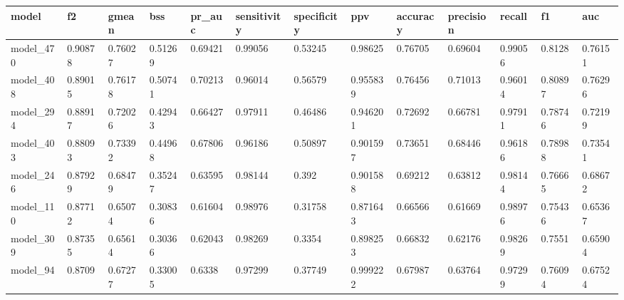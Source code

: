 \begin{tabular}{|l|l|l|l|l|l|l|l|l|l|l|l|l|}
\hline
\textbf{model} & \textbf{f2} & \textbf{gmean} & \textbf{bss} & \textbf{pr\_auc} & \textbf{sensitivity} & \textbf{specificity} & \textbf{ppv} & \textbf{accuracy} & \textbf{precision} & \textbf{recall} & \textbf{f1} & \textbf{auc} \\ \hline
model\_470     & 0.90878     & 0.76027        & 0.51269      & 0.69421          & 0.99056              & 0.53245              & 0.98625      & 0.76705           & 0.69604            & 0.99056         & 0.8128      & 0.76151      \\ \hline
model\_408     & 0.89015     & 0.76178        & 0.50741      & 0.70213          & 0.96014              & 0.56579              & 0.955839     & 0.76456           & 0.71013            & 0.96014         & 0.80897     & 0.76296      \\ \hline
model\_294     & 0.88917     & 0.72026        & 0.42943      & 0.66427          & 0.97911              & 0.46486              & 0.946201     & 0.72692           & 0.66781            & 0.97911         & 0.78746     & 0.72199      \\ \hline
model\_403     & 0.88093     & 0.73392        & 0.44968      & 0.67806          & 0.96186              & 0.50897              & 0.901597     & 0.73651           & 0.68446            & 0.96186         & 0.78988     & 0.73541      \\ \hline
model\_246     & 0.87929     & 0.68479        & 0.35247      & 0.63595          & 0.98144              & 0.392                & 0.901588     & 0.69212           & 0.63812            & 0.98144         & 0.76665     & 0.68672      \\ \hline
model\_110     & 0.87712     & 0.65074        & 0.30836      & 0.61604          & 0.98976              & 0.31758              & 0.871643     & 0.66566           & 0.61669            & 0.98976         & 0.75436     & 0.65367      \\ \hline
model\_309     & 0.87355     & 0.65614        & 0.30366      & 0.62043          & 0.98269              & 0.3354               & 0.898253     & 0.66832           & 0.62176            & 0.98269         & 0.7551      & 0.65904      \\ \hline
model\_94      & 0.8709      & 0.67277        & 0.33005      & 0.6338           & 0.97299              & 0.37749              & 0.999222     & 0.67987           & 0.63764            & 0.97299         & 0.76094     & 0.67524      \\ \hline

\end{tabular}
